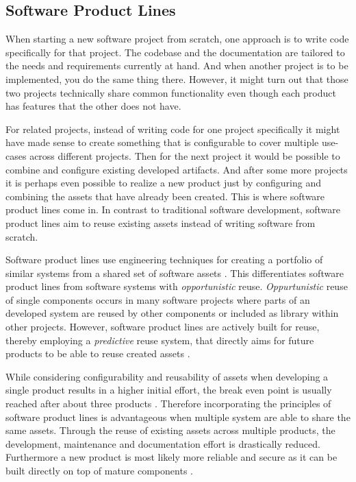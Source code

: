 \documentclass[a4paper]{article}
\begin{document}
\subsection{Software Product Lines}\label{spl}

When starting a new software project from scratch, one approach is to write code specifically for that project. The codebase and the documentation are tailored to the needs and requirements currently at hand. And when another project is to be implemented, you do the same thing there. However, it might turn out that those two projects technically share common functionality even though each product has features that the other does not have.

For related projects, instead of writing code for one project specifically it might have made sense to create something that is configurable to cover multiple use-cases across different projects. Then for the next project it would be possible to combine and configure existing developed artifacts. And after some more projects it is perhaps even possible to realize a new product just by configuring and combining the assets that have already been created. This is where software product lines come in. In contrast to traditional software development, software product lines aim to reuse existing assets instead of writing software from scratch.

Software product lines use engineering techniques for creating a portfolio of similar systems from a shared set of software assets \cite{Intro}. This differentiates software product lines from software systems with \emph{opportunistic} reuse. \emph{Oppurtunistic} reuse of single components occurs in many software projects where parts of an developed system are reused by other components or included as library within other projects. However, software product lines are actively built for reuse, thereby employing a \emph{predictive} reuse system, that directly aims for future products to be able to reuse created assets \cite{Intro}.

While considering configurability and reusability of assets when developing a single product results in a higher initial effort, the break even point is usually reached after about three products \cite[p.4]{spl-in-action} \cite[p.10]{Pohl:2005:SPL:1095605}. Therefore incorporating the principles of software product lines is advantageous when multiple system are able to share the same assets. Through the reuse of existing assets across multiple products, the development, maintenance and documentation effort is drastically reduced. Furthermore a new product is most likely more reliable and secure as it can be built directly on top of mature components  \cite[p.4f]{spl-in-action}. 
\end{document}
